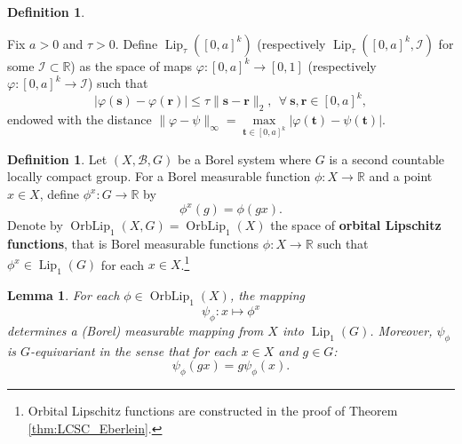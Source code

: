 \documentclass[11pt]{article}
\theoremstyle{plain}
\newtheorem{lem}[thm]{Lemma}
\theoremstyle{definition}
\newtheorem{defn}[thm]{Definition}
\DeclareMathOperator{\Lip}{Lip}
\DeclareMathOperator{\OrbLip}{OrbLip}
\def\R{\mathbb{R}}
\def\tt{\mathbf t}
\def\ss{\mathbf s}
\numberwithin{figure}{section}
\begin{document}
\begin{defn}\label{def:Lip(cube)}
    
   Fix $a>0$ and $\tau>0$. Define $\Lip_{\tau}([0,a]^k)$ (respectively $\Lip_{\tau}([0,a]^k,\mathcal{I})$ for some $\mathcal{I}\subset \R$) as the space of maps $\varphi:[0,a]^k\to[0,1]$ (respectively $\varphi:[0,a]^k\to \mathcal{I}$) such that
   \begin{equation*}
       |\varphi(\ss)-\varphi(\mathbf r)|\leq\tau\|\mathbf{s-r}\|_2,~~\forall~\mathbf{s,r}\in[0,a]^k,
   \end{equation*}
   endowed with the distance $\|\varphi-\psi\|_{\infty}=\max\limits_{\mathbf t\in[0,a]^k}|\varphi(\tt)-\psi(\tt)|$.
\end{defn}


\begin{defn}\label{def:orbital_Lipschitz}
Let $(X,\mathcal{B}, G)$ be a Borel system
 where $G$ is a second countable locally compact group.
For a Borel measurable function $\phi:X\to\R$ and a point $x\in X$, define $\phi^{x}:G\to\mathbb{R}$ by
\begin{equation*}\label{notation g^w}
\phi^{x}(g)=\phi(gx).
\end{equation*}
Denote by $\OrbLip_{1}(X,G)=\OrbLip_{1}(X)$ the space of \textbf{orbital Lipschitz functions}, that is Borel measurable functions $\phi:X\to\mathbb{R}$ such that $\phi^{x}\in \Lip_{1}(G)$ for each $x\in X$.\footnote{Orbital Lipschitz functions  are constructed in the proof of Theorem \ref{thm:LCSC_Eberlein}.}
\end{defn}

\begin{lem}\label{measurable}
For each $\phi\in \OrbLip_{1}(X)$, the mapping
\begin{equation}\label{psi}
\psi_{\phi}:x\mapsto \phi^{x}
\end{equation}
determines a (Borel) measurable mapping from $X$ into $\Lip_{1}(G)$. Moreover, $\psi_{\phi}$ is $G$-equivariant in the sense that for each $x\in X$ and $g\in G$:
\begin{equation*}
\psi_{\phi}(gx)=g \psi_{\phi}(x).
\end{equation*}
\end{lem}
\end{document}
